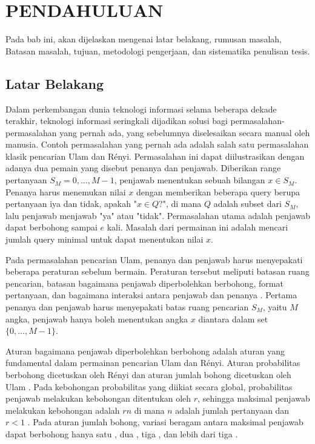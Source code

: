 \vspace{0ex}
\chapter {PENDAHULUAN}
Pada bab ini, akan dijelaskan mengenai latar belakang, rumusan masalah, Batasan masalah, tujuan, metodologi pengerjaan, dan sistematika penulisan tesis.

\section{Latar Belakang}
\par Dalam perkembangan dunia teknologi informasi selama beberapa dekade terakhir, teknologi informasi seringkali dijadikan solusi bagi permasalahan-permasalahan yang pernah ada, yang sebelumnya diselesaikan secara manual oleh manusia. Contoh permasalahan yang pernah ada adalah salah satu permasalahan klasik pencarian Ulam dan Rényi. Permasalahan ini dapat diilustrasikan dengan adanya dua pemain yang disebut penanya dan penjawab. Diberikan range pertanyaan $S_M = {0,\ldots,M-1}$, penjawab menentukan sebuah bilangan $x \in S_M$. Penanya harus menemukan nilai $x$ dengan memberikan beberapa query berupa pertanyaan iya dan tidak, apakah "$x \in Q$?", di mana $Q$ adalah subset dari $S_M$, lalu penjawab menjawab "ya" atau "tidak". Permasalahan utama adalah penjawab dapat berbohong sampai $e$ kali. Masalah dari permainan ini adalah mencari jumlah query minimal untuk dapat menentukan nilai $x$.

Pada permasalahan pencarian Ulam, penanya dan penjawab harus menyepakati beberapa peraturan sebelum bermain. Peraturan tersebut meliputi batasan ruang pencarian, batasan bagaimana penjawab diperbolehkan berbohong, format pertanyaan, dan bagaimana interaksi antara penjawab dan penanya \cite{Pelc2002}. Pertama penanya dan penjawab harus menyepakati batas ruang pencarian $S_M$, yaitu $M$ angka, penjawab hanya boleh menentukan angka $x$ diantara dalam set $\{0,\ldots,M-1\}$.

Aturan bagaimana penjawab diperbolehkan berbohong adalah aturan yang fundamental dalam permainan pencarian Ulam dan Rényi. Aturan probabilitas berbohong dicetuskan oleh Rényi dan aturan jumlah bohong dicetuskan oleh Ulam \cite{StanislawMUlam1976}. Pada kebohongan probabilitas yang diikiat secara global, probabilitas penjawab melakukan kebohongan ditentukan oleh $r$, sehingga maksimal penjawab melakukan kebohongan adalah $rn$ di mana $n$ adalah jumlah pertanyaan dan $r<1$ \cite{Dhagat1999}. Pada aturan jumlah bohong, variasi beragam antara maksimal penjawab dapat berbohong hanya satu \cite{Ellis2008} \cite{Pelc1988}, dua \cite{Cicalese2000}, tiga \cite{Negro1992}, dan lebih dari tiga \cite{Berlekamp1998} \cite{Deppe2004}.

